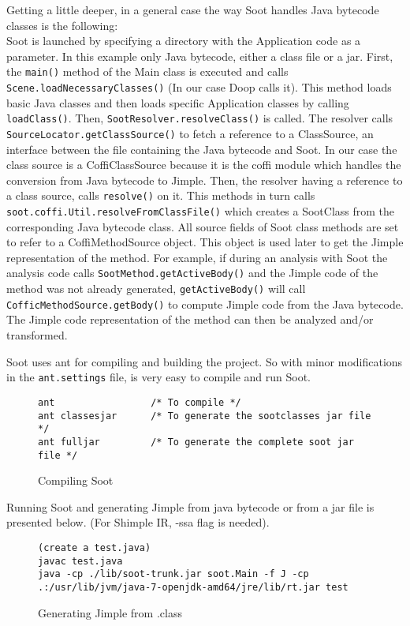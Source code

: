 \documentclass{dithesis}
\begin{document}
        Getting a little deeper, in a general case the way Soot handles Java bytecode classes is the following: \\
        Soot is launched by specifying a directory with the Application code as a parameter. In this example only Java bytecode, either a class file or a jar. First, the \texttt{main()} method of the Main class is executed and calls \texttt{Scene.loadNecessaryClasses()} (In our case Doop calls it). This method loads basic Java classes and then loads specific Application classes by calling \texttt{loadClass()}. Then, \texttt{SootResolver.resolveClass()} is called. The resolver calls \texttt{SourceLocator.getClassSource()} to fetch a reference to a ClassSource, an interface between the file containing the Java bytecode and Soot. In our case the class source is a CoffiClassSource because it is the coffi module which handles the conversion from Java bytecode to Jimple. Then, the resolver having a reference to a class source, calls \texttt{resolve()} on it. This methods in turn calls \texttt{soot.coffi.Util.resolveFromClassFile()} which creates a SootClass from the corresponding Java bytecode class. All source fields of Soot class methods are set to refer to a CoffiMethodSource object. This object is used later to get the Jimple representation of the method. For example, if during an analysis with Soot the analysis code calls \texttt{SootMethod.getActiveBody()} and the Jimple code of the method was not already generated, \texttt{getActiveBody()} will call \texttt{CofficMethodSource.getBody()} to compute Jimple code from the Java bytecode. The Jimple code representation of the method can then be analyzed and/or transformed.

    	Soot uses ant \cite{Apache Ant} for compiling and building the project. So with minor modifications in the \texttt{ant.settings} file, is very easy to compile and run Soot.
        \begin{figure}[H]
\begin{lstlisting}
ant                 /* To compile */
ant classesjar      /* To generate the sootclasses jar file */
ant fulljar         /* To generate the complete soot jar file */
\end{lstlisting}
        \caption{Compiling Soot}
        \end{figure}

        Running Soot and generating Jimple from java bytecode or from a jar file is presented below. (For Shimple IR, -ssa flag is needed).
        \begin{figure}[H]
\begin{lstlisting}
(create a test.java)
javac test.java
java -cp ./lib/soot-trunk.jar soot.Main -f J -cp .:/usr/lib/jvm/java-7-openjdk-amd64/jre/lib/rt.jar test
\end{lstlisting}
        \caption{Generating Jimple from .class}
        \end{figure}
\end{document}
